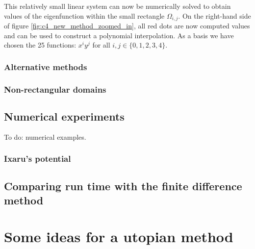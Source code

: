 This relatively small linear system can now be numerically solved to obtain values of the eigenfunction within the small rectangle $\Omega_{i,j}$. On the right-hand side of figure \ref{fig:c4_new_method_zoomed_in}, all red dots are now computed values and can be used to construct a polynomial interpolation. As a basis we have chosen the 25 functions: $x^i y^j$ for all $i,j \in \{0,1,2,3,4\}$.


\subsubsection{Alternative methods}




\subsubsection{Non-rectangular domains}


\subsection{Numerical experiments}

{\color{red}To do: numerical examples}.

\subsubsection{Ixaru's potential}\label{sec:c4_new_method_ixaru}

\subsection{Comparing run time with the finite difference method}\label{sec:c4_nm_vs_fd}

\section{Some ideas for a utopian method}\label{c4:sec_utopy}


\stopchapter

